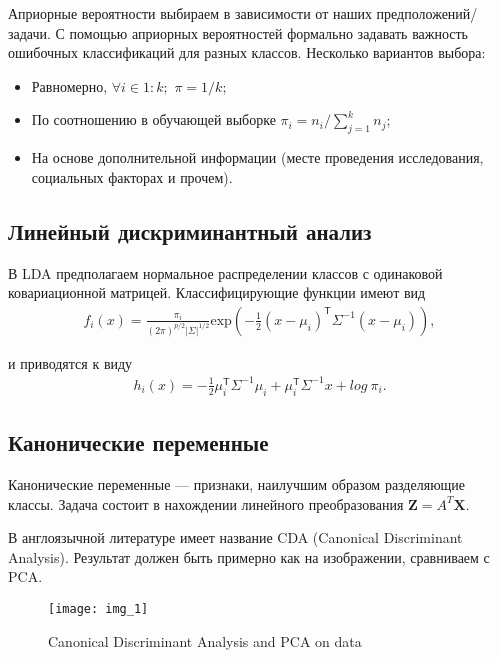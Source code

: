 \documentclass[12pt]{article}
\begin{document}
	Априорные вероятности выбираем в зависимости от наших предположений/задачи. С помощью априорных вероятностей формально задавать важность ошибочных классификаций для разных классов. Несколько вариантов выбора:
	
	\begin{itemize}
		\item Равномерно, $\forall i \in 1:k;$ $\pi = 1/k$;
		\item По соотношению в обучающей выборке $\pi_i = n_i / \sum_{j=1}^{k} n_j$;
		\item На основе дополнительной информации (месте проведения исследования, социальных факторах и прочем). 
	\end{itemize}
	
	\subsection{Линейный дискриминантный анализ}
	
	В LDA предполагаем нормальное распределении классов с одинаковой ковариационной матрицей. Классифицирующие функции имеют вид
	\begin{eqnarray}\label{LDA}  
		f_i (x) = \frac {\pi_i}{(2\pi)^{p/2} \vert \Sigma \vert ^{1/2}} \textrm{exp} \left(-\frac{1}{2}(x-\mu_i)^\mathsf{T}\Sigma^{-1}(x-\mu_i)\right), 
	\end{eqnarray}

	и приводятся к виду 
	\begin{eqnarray}\label{LDA}  
		h_i (x) = - \frac{1}{2} \mu_{i}^\mathsf{T} \Sigma^{-1} \mu_i + \mu_{i}^\mathsf{T} \Sigma^{-1}x + log \ \pi_i.
	\end{eqnarray}
	
	\subsection{Канонические переменные} 
	Канонические переменные --- признаки, наилучшим образом разделяющие классы. Задача состоит в нахождении линейного преобразования $\mathbf{Z} = A^T \mathbf{X}$. 
	
	В англоязычной литературе имеет название CDA (Canonical Discriminant Analysis). Результат должен быть примерно как на изображении, сравниваем с PCA.
	
	\smallbreak
	
	\begin{figure}
		\texttt{[image: img\_1]}
		\caption{Canonical Discriminant Analysis and PCA on data}
		\label{2}
	\end{figure}
	
\end{document}
